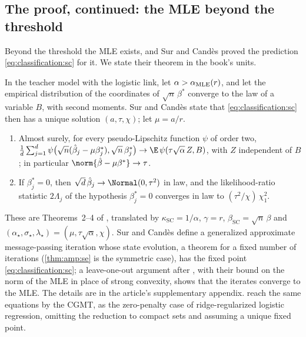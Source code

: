\begin{refsection}
\section{The proof, continued: the MLE beyond the threshold}\label{sec:classification:mle}

Beyond the threshold the MLE exists, and Sur and Candès proved the prediction \eqref{eq:classification:sc} for it. We state their theorem in the book's units.

\begin{theorem}\label{thm:classification:surcandes}
In the teacher model with the logistic link, let $\alpha>\alpha_{\mathrm{MLE}}(r)$, and let the empirical distribution of the coordinates of $\sqrt n\,\beta^*$ converge to the law of a variable $B$, with second moments. Sur and Candès state that \eqref{eq:classification:sc} then has a unique solution $(a,\tau,\chi)$; let $\mu=a/r$.
\begin{enumerate}
\item Almost surely, for every pseudo-Lipschitz function $\psi$ of order two, $\frac1d\sum_{j=1}^d\psi\bigl(\sqrt n(\hat\beta_j-\mu\beta^*_j),\sqrt n\,\beta^*_j\bigr)\to\E\,\psi(\tau\sqrt\alpha\,Z,B)$, with $Z$ independent of $B$; in particular $\norm{\hat\beta-\mu\beta^*}\to\tau$.
\item If $\beta^*_j=0$, then $\sqrt d\,\hat\beta_j\to\Normal(0,\tau^2)$ in law, and the likelihood-ratio statistic $2\Lambda_j$ of the hypothesis $\beta^*_j=0$ converges in law to $(\tau^2/\chi)\,\chi^2_1$.
\end{enumerate}
\end{theorem}

\begin{proofsketch}
These are Theorems~2--4 of \textcite{SurCandes2019}, translated by $\kappa_{\mathrm{SC}}=1/\alpha$, $\gamma=r$, $\beta_{\mathrm{SC}}=\sqrt n\,\beta$ and $(\alpha_\star,\sigma_\star,\lambda_\star)=(\mu,\tau\sqrt\alpha,\chi)$. Sur and Candès define a generalized approximate message-passing iteration whose state evolution, a theorem for a fixed number of iterations \parencite{JavanmardMontanari2013} (\cref{thm:amp:se} is the symmetric case), has the fixed point \eqref{eq:classification:sc}; a leave-one-out argument after \textcite{SurChenCandes2019}, with their bound on the norm of the MLE in place of strong convexity, shows that the iterates converge to the MLE. The details are in the article's supplementary appendix. \Textcite{SalehiAbbasiHassibi2019} reach the same equations by the CGMT, as the zero-penalty case of ridge-regularized logistic regression, omitting the reduction to compact sets and assuming a unique fixed point.
\end{proofsketch}


\end{refsection}

